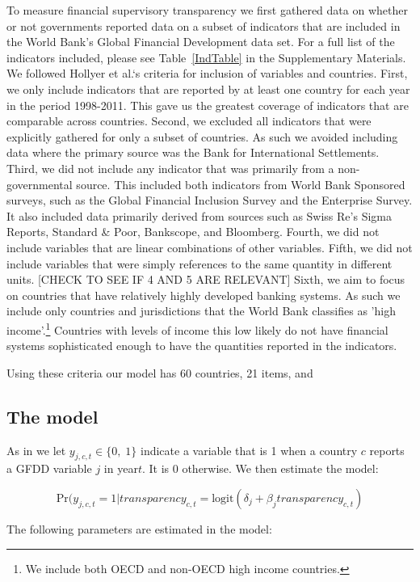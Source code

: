 \documentclass[a4paper]{article}
\begin{document}
To measure financial supervisory transparency we first gathered data on whether or not governments reported data on a subset of indicators that are included in the World Bank's Global Financial Development data set. For a full list of the indicators included, please see Table~\ref{IndTable} in the Supplementary Materials. We followed Hollyer et al.`s \citeyearpar{Hollyer2014} criteria for inclusion of variables and countries. First, we only include indicators that are reported by at least one country for each year in the period 1998-2011. This gave us the greatest coverage of indicators that are comparable across countries. Second, we excluded all indicators that were explicitly gathered for only a subset of countries. As such we avoided including data where the primary source was the Bank for International Settlements. Third, we did not include any indicator that was primarily from a non-governmental source. This included both indicators from World Bank Sponsored surveys, such as the Global Financial Inclusion Survey and the Enterprise Survey. It also included data primarily derived from sources such as Swiss Re's Sigma Reports, Standard \& Poor, Bankscope, and Bloomberg. Fourth, we did not include variables that are linear combinations of other variables. Fifth, we did not include variables that were simply references to the same quantity in different units. [CHECK TO SEE IF 4 AND 5 ARE RELEVANT] Sixth, we aim to focus on countries that have relatively highly developed banking systems. As such we include only countries and jurisdictions that the World Bank classifies as 'high income'.\footnote{We include both OECD and non-OECD high income countries.} Countries with levels of income this low likely do not have financial systems sophisticated enough to have the quantities reported in the indicators. 

Using these criteria our model has 60 countries, 21 items, and  

\subsection{The model}

As in \cite{Hollyer2014} we let $y_{j,c,t} \in \{0,\; 1\}$ indicate a variable that is 1 when a country $c$ reports a GFDD variable $j$ in year$t$. It is 0 otherwise. We then estimate the model:

\[
    \mathrm{Pr}(y_{j,c,t} = 1|transparency_{c,t} = \mathrm{logit}(\delta_{j} + \beta_{j}transparency_{c,t})
\]

The following parameters are estimated in the model:
\end{document}
